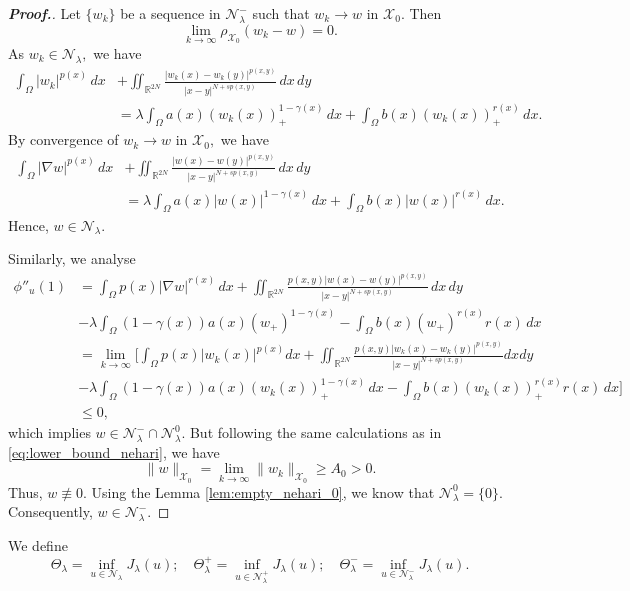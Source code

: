 \documentclass[11pt]{article}
\newcommand{\X}{\mathcal{X}_{0}}
\newcommand{\Th} {\Theta}
\newcommand{\om} {\Omega}
\newcommand{\la} {\lambda}
\newcommand{\grad}{\nabla}
\begin{document}
\begin{proof}[\bf Proof.]
Let $\{w_k\}$
be a sequence in $\mathcal{N}_\lambda^-$
such that $w_k \to w$
in $\X.$
Then
\[
\lim_{k \to \infty} \rho_{\X}(w_k - w) = 0.
\]
  As $w_k \in \mathcal{N}_\lambda,$
we have
\begin{align*}
\int_\Omega |w_k|^{p(x)} \, dx 
&+ \iint_{\mathbb{R}^{2N}} 
\frac{|w_k(x) - w_k(y)|^{p(x,y)}}
{|x - y|^{N + s p(x,y)}} \, dx \, dy \\
&= \lambda 
\int_\Omega a(x) (w_k(x))_+^{1 - \gamma(x)} \, dx + 
\int_\Omega b(x) (w_k(x))_+^{r(x)} \, dx.
\end{align*}  
By convergence of $w_k \to w$
in $\X,$
we have
\begin{align*}
\int_\Omega |\grad w|^{p(x)} \, dx 
&+ \iint_{\mathbb{R}^{2N}} 
\frac{|w(x) - w(y)|^{p(x,y)}}
{|x - y|^{N + s p(x,y)}} \, dx \, dy \\
&= \lambda 
\int_\Omega a(x) |w(x)|^{1 - \gamma(x)} \, dx + 
\int_\Omega b(x) |w(x)|^{r(x)} \, dx.
\end{align*}
Hence, $w \in \mathcal{N}_\lambda$.

  Similarly, we analyse
\begin{align*}
\phi''_u(1) & =
\int_\Omega p(x) |\grad w|^{r(x)} \, dx+ 
\iint_{\mathbb{R}^{2N}} 
\frac{p(x,y) |w(x)- w(y)|^{p(x,y)}}
{|x - y|^{N + s p(x,y)}} \, dx \, dy\\
& - \la 
\int_{\om}(1-\gamma(x))a(x)(w_+)^{1 - \gamma(x)}- 
\int_\Omega b(x) (w_+)^{r(x)} r(x) \, dx\\
& = \lim_{k \to \infty}
\Big [
\int_\Omega p(x) |w_k(x)|^{p(x)}   dx 
\! + \!
\iint_{\mathbb{R}^{2N}} 
\frac{p(x,y) |w_k(x) - w_k(y)|^{p(x,y)}}
{|x - y|^{N + s p(x,y)}}  dx  dy   
\\
&    - \lambda 
\int_\Omega (1 - \gamma(x)) a(x) 
(w_k(x))_+^{1 - \gamma(x)} \, dx 
- 
\int_\Omega b(x) (w_k(x))_+^{r(x)} r(x) \, dx
\Big ] \\
&\leq 0,
\end{align*}
which implies 
$w \in \mathcal{N}_\lambda^- \cap \mathcal{N}_\lambda^0.$
But following the same calculations as in 
\eqref{eq:lower_bound_nehari}, we have
\[
\|w\|_{\X} = \lim_{k \to \infty} \|w_k\|_{\X} 
\geq A_0 > 0.
\]
Thus, \( w \not\equiv 0 \).
Using the Lemma \ref{lem:empty_nehari_0}, 
we know that $\mathcal{N}_\lambda^0 = \{0\}.$
Consequently, 
\( w \in \mathcal{N}_\lambda^- \).
\end{proof}

 
We define
$$
\Th_\la=\inf_{u\in \mathcal{N}_\la}J_\la(u);
\quad 
\Th_\la^+=\inf_{u\in \mathcal{N}_\la^+}J_\la(u);
\quad 
\Th_\la^-=\inf_{u\in \mathcal{N}_\la^-}J_\la(u).
$$
\end{document}
